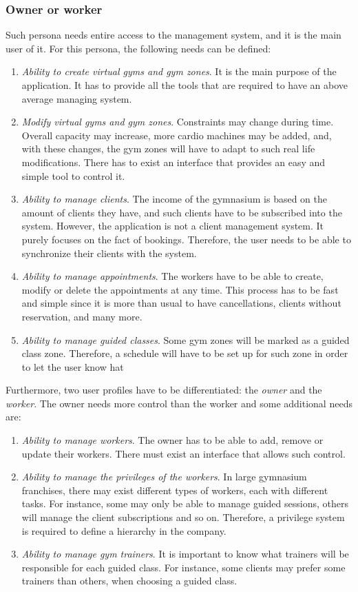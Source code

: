 \documentclass[a4paper,12pt]{book}
\begin{document}
\subsubsection{Owner or worker}
Such persona needs entire access to the management system, and it is the main user of it. For this persona, the following needs can be defined:
\begin{enumerate}[label = -]
	\item \emph{Ability to create virtual gyms and gym zones}. It is the main purpose of the application. It has to provide all the tools that are required to have an above average managing system.
	\item \emph{Modify virtual gyms and gym zones}. Constraints may change during time. Overall capacity may increase, more cardio machines may be added, and, with these changes, the gym zones will have to adapt to such real life modifications. There has to exist an interface that provides an easy and simple tool to control it.
	\item \emph{Ability to manage clients}. The income of the gymnasium is based on the amount of clients they have, and such clients have to be subscribed into the system. However, the application is not a client management system. It purely focuses on the fact of bookings. Therefore, the user needs to be able to synchronize their clients with the system.
	\item \emph{Ability to manage appointments}. The workers have to be able to create, modify or delete the appointments at any time. This process has to be fast and simple since it is more than usual to have cancellations, clients without reservation, and many more.
	\item \emph{Ability to manage guided classes}. Some gym zones will be marked as a guided class zone. Therefore, a schedule will have to be set up for such zone in order to let the user know hat
\end{enumerate}
Furthermore, two user profiles have to be differentiated: the \emph{owner} and the \emph{worker}. The owner needs more control than the worker and some additional needs are:
\begin{enumerate}[label = -]
	\item \emph{Ability to manage workers}. The owner has to be able to add, remove or update their workers. There must exist an interface that allows such control.
	\item \emph{Ability to manage the privileges of the workers}. In large gymnasium franchises, there may exist different types of workers, each with different tasks. For instance, some may only be able to manage guided sessions, others will manage the client subscriptions and so on. Therefore, a privilege system is required to define a hierarchy in the company.
	\item \emph{Ability to manage gym trainers}. It is important to know what trainers will be responsible for each guided class. For instance, some clients may prefer some trainers than others, when choosing a guided class.
\end{enumerate}
\end{document}
